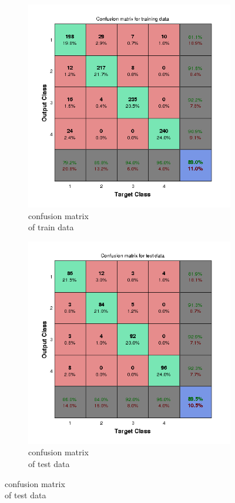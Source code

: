 \documentclass[fleqn]{article}
\begin{document}
\begin{figure}[!ht]
\begin{subfigure}{.5\textwidth}
\caption{confusion matrix \\ of train data}
\includegraphics[scale=0.4]{./pics/overlapping_data/_14_16/_14_16_epoch_Inf_confusiontrain}
\end{subfigure}
\begin{subfigure}{.5\textwidth}
\caption{confusion matrix \\ of test data}
\includegraphics[scale=0.5]{./pics/overlapping_data/_14_16/_14_16_epoch_Inf_confusiontest}
\end{subfigure}
\end{figure}
\end{document}
